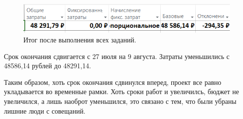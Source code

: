 \documentclass[a4paper,14pt]{extreport} %
\begin{document}
\begin{enumerate}
\begin{figure}[H]
	\centering
	\caption{Итог после выполнения всех заданий. }
	\includegraphics[scale=0.8]{result3}
\end{figure}
Срок окончания сдвигается с 27 июля на 9 августа. Затраты уменьшились с 48586,14 рублей до 48291,14.

Таким образом, хоть срок окончания сдвинулся вперед, проект все равно укладывается во временные рамки. Хоть сроки работ и увеличилсь, бюджет не увеличился, а лишь наоброт уменьшился, это связано с тем, что были убраны лишние люди с совещаний.


\end{enumerate}
\end{document}
